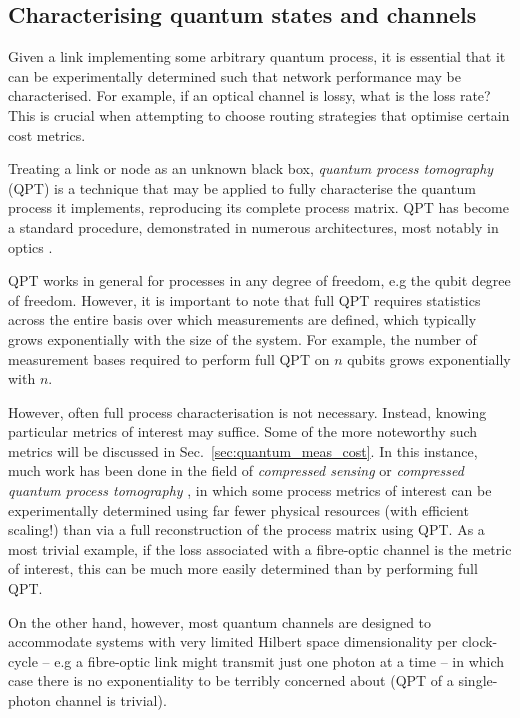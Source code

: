 \documentclass[aps,rmp,twocolumn,amsmath,amssymb,nofootinbib,superscriptaddress,longbibliography,floatfix,table-of-contents,eqsecnum]{revtex4-1}
\begin{document}
%
%

\subsection{Characterising quantum states and channels} \label{sec:QPT}

Given a link implementing some arbitrary quantum process, it is essential that it can be experimentally determined such that network performance may be characterised. For example, if an optical channel is lossy, what is the loss rate? This is crucial when attempting to choose routing strategies that optimise certain cost metrics.

Treating a link or node as an unknown black box, \textit{quantum process tomography} (QPT) \cite{bib:ChuangNielsen97, ???} is a technique that may be applied to fully characterise the quantum process it implements, reproducing its complete process matrix. QPT has become a standard procedure, demonstrated in numerous architectures, most notably in optics \cite{bib:OBrien04, bib:RohdeGateChar05}.

QPT works in general for processes in any degree of freedom, e.g the qubit degree of freedom. However, it is important to note that full QPT requires statistics across the entire basis over which measurements are defined, which typically grows exponentially with the size of the system. For example, the number of measurement bases required to perform full QPT on $n$ qubits grows exponentially with $n$.

However, often full process characterisation is not necessary. Instead, knowing particular metrics of interest may suffice. Some of the more noteworthy such metrics will be discussed in Sec.~\ref{sec:quantum_meas_cost}. In this instance, much work has been done in the field of \textit{compressed sensing} or \textit{compressed quantum process tomography} \cite{???,compressed_sensing}, in which some process metrics of interest can be experimentally determined using far fewer physical resources (with efficient scaling!) than via a full reconstruction of the process matrix using QPT. As a most trivial example, if the loss associated with a fibre-optic channel is the metric of interest, this can be much more easily determined than by performing full QPT.

On the other hand, however, most quantum channels are designed to accommodate systems with very limited Hilbert space dimensionality per clock-cycle -- e.g a fibre-optic link might transmit just one photon at a time -- in which case there is no exponentiality to be terribly concerned about (QPT of a single-photon channel is trivial).
\end{document}
